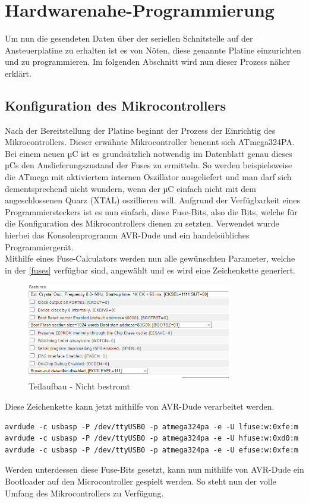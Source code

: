 \section{Hardwarenahe-Programmierung}
Um nun die gesendeten Daten über der seriellen Schnitstelle auf der Ansteuerplatine zu erhalten ist es von Nöten, diese genannte Platine einzurichten und zu programmieren.
Im folgenden Abschnitt wird nun dieser Prozess näher erklärt.
\subsection{Konfiguration des Mikrocontrollers}
Nach der Bereitstellung der Platine beginnt der Prozess der Einrichtig des Mikrocontrollers.
Dieser erwähnte Mikrocontroller benennt sich ATmega324PA.
Bei einem neuen µC ist es grundsätzlich notwendig im Datenblatt genau dieses µCs den Auslieferungszustand der Fuses zu ermitteln.
So werden beispielsweise die ATmega mit aktiviertem internen Oszillator ausgeliefert und man darf sich dementsprechend nicht wundern, wenn der µC einfach nicht mit dem angeschlossenen Quarz (XTAL) oszillieren will.
Aufgrund der Verfügbarkeit eines Programmiersteckers ist es nun einfach, diese Fuse-Bits, also die Bits, welche für die Konfiguration des Mikrocontrollers dienen zu setzten.
Verwendet wurde hierbei das Konsolenprogramm AVR-Dude und ein handelsübliches Programmiergerät.\\
Mithilfe eines Fuse-Calculators werden nun alle gewünschten Parameter, welche in der \autoref{fuses} verfügbar sind, angewählt und es wird eine Zeichenkette generiert.
\begin{figure}[H]
\centering
\includegraphics[width=0.8\textwidth]{fig/ainf/features}
\caption{Teilaufbau - Nicht bestromt}
\label{fuses}
\end{figure}
Diese Zeichenkette kann jetzt mithilfe von AVR-Dude verarbeitet werden.
\begin{lstlisting}[style=java,caption=Java-Codebeispiel,label=resource]
avrdude -c usbasp -P /dev/ttyUSB0 -p atmega324pa -e -U lfuse:w:0xfe:m
avrdude -c usbasp -P /dev/ttyUSB0 -p atmega324pa -e -U hfuse:w:0xd0:m
avrdude -c usbasp -P /dev/ttyUSB0 -p atmega324pa -e -U efuse:w:0xfe:m
\end{lstlisting}
Werden unterdessen diese Fuse-Bits gesetzt, kann nun mithilfe von AVR-Dude ein Bootloader auf den Microcontroller gespielt werden.
So steht nun der volle Umfang des Mikrocontrollers zu Verfügung.\\\\
